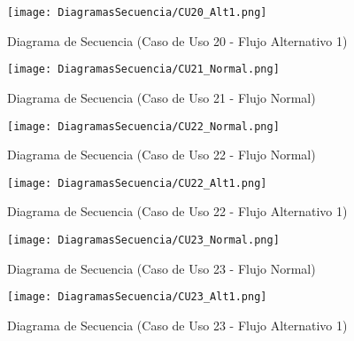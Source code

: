 \begin{landscape}
  \begin{figure}[!htbp]
    \centering
    \texttt{[image: DiagramasSecuencia/CU20\_Alt1.png]}
    \caption{Diagrama de Secuencia (Caso de Uso 20 - Flujo Alternativo 1)}
    \label{fig:Secuencia_CU20_Alt1}
  \end{figure}
\end{landscape}
\FloatBarrier

\begin{landscape}
  \begin{figure}[!htbp]
    \centering
    \texttt{[image: DiagramasSecuencia/CU21\_Normal.png]}
    \caption{Diagrama de Secuencia (Caso de Uso 21 - Flujo Normal)}
    \label{fig:Secuencia_CU21_Normal}
  \end{figure}
\end{landscape}
\FloatBarrier

\begin{landscape}
  \begin{figure}[!htbp]
    \centering
    \texttt{[image: DiagramasSecuencia/CU22\_Normal.png]}
    \caption{Diagrama de Secuencia (Caso de Uso 22 - Flujo Normal)}
    \label{fig:Secuencia_CU22_Normal}
  \end{figure}
\end{landscape}
\FloatBarrier

\begin{landscape}
  \begin{figure}[!htbp]
    \centering
    \texttt{[image: DiagramasSecuencia/CU22\_Alt1.png]}
    \caption{Diagrama de Secuencia (Caso de Uso 22 - Flujo Alternativo 1)}
    \label{fig:Secuencia_CU22_Alt1}
  \end{figure}
\end{landscape}
\FloatBarrier

\begin{landscape}
  \begin{figure}[!htbp]
    \centering
    \texttt{[image: DiagramasSecuencia/CU23\_Normal.png]}
    \caption{Diagrama de Secuencia (Caso de Uso 23 - Flujo Normal)}
    \label{fig:Secuencia_CU23_Normal}
  \end{figure}
\end{landscape}
\FloatBarrier

\begin{landscape}
  \begin{figure}[!htbp]
    \centering
    \texttt{[image: DiagramasSecuencia/CU23\_Alt1.png]}
    \caption{Diagrama de Secuencia (Caso de Uso 23 - Flujo Alternativo 1)}
    \label{fig:Secuencia_CU23_Alt1}
  \end{figure}
\end{landscape}
\FloatBarrier

